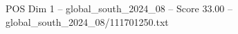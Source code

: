 \begin{textsample}{POS Dim 1 – global\_south\_2024\_08 – Score 33.00 – global\_south\_2024\_08/111701250.txt}
\end{textsample}
